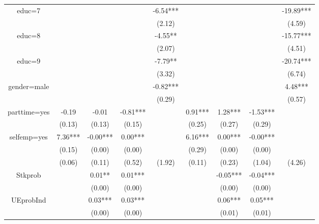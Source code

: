 \documentclass[12pt,notitlepage,onecolumn,aps,pra]{article}
\begin{document}
\begin{table}[ht]
\begin{adjustbox}{width={0.9\textwidth},totalheight={\textheight}}
\begin{threeparttable}
\begin{tabular}{ccccccccc}
educ=7       &          &           &            &    -6.54*** &           &            &             &    -19.89*** \\
             &          &           &            &      (2.12) &           &            &             &       (4.59) \\
educ=8       &          &           &            &     -4.55** &           &            &             &    -15.77*** \\
             &          &           &            &      (2.07) &           &            &             &       (4.51) \\
educ=9       &          &           &            &     -7.79** &           &            &             &    -20.74*** \\
             &          &           &            &      (3.32) &           &            &             &       (6.74) \\
gender=male  &          &           &            &    -0.82*** &           &            &             &      4.48*** \\
             &          &           &            &      (0.29) &           &            &             &       (0.57) \\
parttime=yes &    -0.19 &     -0.01 &   -0.81*** &             &   0.91*** &    1.28*** &    -1.53*** &              \\
             &   (0.13) &    (0.13) &     (0.15) &             &    (0.25) &     (0.27) &      (0.29) &              \\
selfemp=yes  &  7.36*** &  -0.00*** &    0.00*** &             &   6.16*** &    0.00*** &    -0.00*** &              \\
             &   (0.15) &    (0.00) &     (0.00) &             &    (0.29) &     (0.00) &      (0.00) &              \\
             &   (0.06) &    (0.11) &     (0.52) &      (1.92) &    (0.11) &     (0.23) &      (1.04) &       (4.26) \\
Stkprob      &          &    0.01** &    0.01*** &             &           &   -0.05*** &    -0.04*** &              \\
             &          &    (0.00) &     (0.00) &             &           &     (0.00) &      (0.00) &              \\
UEprobInd    &          &   0.03*** &    0.03*** &             &           &    0.06*** &     0.05*** &              \\
             &          &    (0.00) &     (0.00) &             &           &     (0.01) &      (0.01) &              \\

\end{tabular}
\end{threeparttable}
\end{adjustbox}
\end{table}
\end{document}
